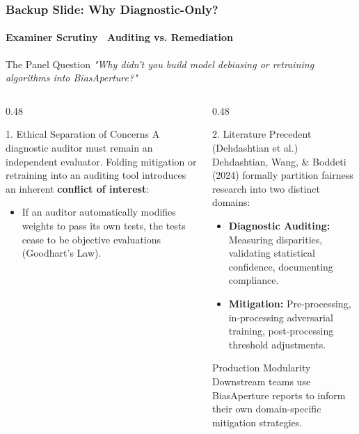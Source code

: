\begin{frame}
  \frametitle{Backup Slide: Why Diagnostic-Only?}
  \framesubtitle{Examiner Scrutiny \textbar\ Auditing vs. Remediation}

  \begin{alertcard}{The Panel Question}
    \scriptsize \textit{"Why didn't you build model debiasing or retraining algorithms into BiasAperture?"}
  \end{alertcard}

  \vspace{0.05cm}
  \begin{columns}[T]
    \begin{column}{0.48\textwidth}
      \begin{card}{1. Ethical Separation of Concerns}
        \scriptsize A diagnostic auditor must remain an independent evaluator. Folding mitigation or retraining into an auditing tool introduces an inherent \textbf{conflict of interest}:
        \vspace{0.05cm}
        \begin{itemize}\scriptsize
          \item If an auditor automatically modifies weights to pass its own tests, the tests cease to be objective evaluations (Goodhart's Law).
        \end{itemize}
      \end{card}
    \end{column}

    \begin{column}{0.48\textwidth}
      \begin{card}{2. Literature Precedent (Dehdashtian et al.)}
        \scriptsize Dehdashtian, Wang, \& Boddeti (2024) formally partition fairness research into two distinct domains:
        \vspace{0.05cm}
        \begin{itemize}\scriptsize
          \item \textbf{Diagnostic Auditing:} Measuring disparities, validating statistical confidence, documenting compliance.
          \item \textbf{Mitigation:} Pre-processing, in-processing adversarial training, post-processing threshold adjustments.
        \end{itemize}
      \end{card}

      \vspace{0.05cm}
      \begin{statcard}{Production Modularity}
        \scriptsize Downstream teams use BiasAperture reports to inform their own domain-specific mitigation strategies.
      \end{statcard}
    \end{column}
  \end{columns}
\end{frame}

